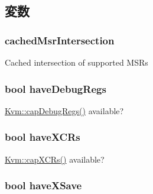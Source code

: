 \subsection{変数}
\hypertarget{classX86KvmCPU_aa0f07c7b56f9fd1e68e7ebdc2e3a9428}{
\subsubsection[{cachedMsrIntersection}]{ {\bf cachedMsrIntersection}}}
\label{classX86KvmCPU_aa0f07c7b56f9fd1e68e7ebdc2e3a9428}
Cached intersection of supported MSRs \hypertarget{classX86KvmCPU_ab7c96fcfb73a6d3ca276a6dce2ee76bb}{
\subsubsection[{haveDebugRegs}]{\setlength{\rightskip}{0pt plus 5cm}bool {\bf haveDebugRegs}}}
\label{classX86KvmCPU_ab7c96fcfb73a6d3ca276a6dce2ee76bb}
\hyperlink{classKvm_a4e15b92a17300f1d37ceca6e4a984086}{Kvm::capDebugRegs()} available? \hypertarget{classX86KvmCPU_acb9f794b9c9ccc1422b1b5ba9e4823b6}{
\subsubsection[{haveXCRs}]{\setlength{\rightskip}{0pt plus 5cm}bool {\bf haveXCRs}}}
\label{classX86KvmCPU_acb9f794b9c9ccc1422b1b5ba9e4823b6}
\hyperlink{classKvm_aa9b34836edde016c16df3006fb33b0a9}{Kvm::capXCRs()} available? \hypertarget{classX86KvmCPU_ac0fd3f6d7cf7fa1132de384a5953228c}{
\subsubsection[{haveXSave}]{\setlength{\rightskip}{0pt plus 5cm}bool {\bf haveXSave}}}
